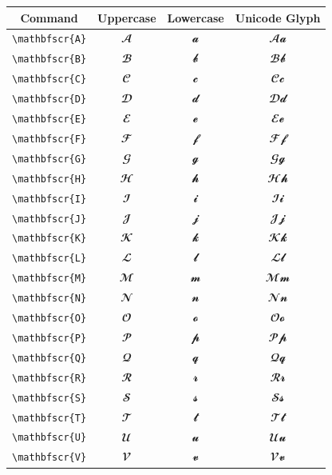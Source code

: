 \documentclass[12pt,a4paper]{article}
\begin{document}
\begin{longtable}{|c|c|c|c|}
\hline
\textbf{Command} & \textbf{Uppercase} & \textbf{Lowercase} & \textbf{Unicode Glyph} \\
\hline
\verb|\mathbfscr{A}| & $\mathbfscr{A}$ & $\mathbfscr{a}$ & $ 𝓐 𝓪 $ \\
\verb|\mathbfscr{B}| & $\mathbfscr{B}$ & $\mathbfscr{b}$ & $ 𝓑 𝓫 $ \\
\verb|\mathbfscr{C}| & $\mathbfscr{C}$ & $\mathbfscr{c}$ & $ 𝓒 𝓬 $ \\
\verb|\mathbfscr{D}| & $\mathbfscr{D}$ & $\mathbfscr{d}$ & $ 𝓓 𝓭 $ \\
\verb|\mathbfscr{E}| & $\mathbfscr{E}$ & $\mathbfscr{e}$ & $ 𝓔 𝓮 $ \\
\verb|\mathbfscr{F}| & $\mathbfscr{F}$ & $\mathbfscr{f}$ & $ 𝓕 𝓯 $ \\
\verb|\mathbfscr{G}| & $\mathbfscr{G}$ & $\mathbfscr{g}$ & $ 𝓖 𝓰 $ \\
\verb|\mathbfscr{H}| & $\mathbfscr{H}$ & $\mathbfscr{h}$ & $ 𝓗 𝓱 $ \\
\verb|\mathbfscr{I}| & $\mathbfscr{I}$ & $\mathbfscr{i}$ & $ 𝓘 𝓲 $ \\
\verb|\mathbfscr{J}| & $\mathbfscr{J}$ & $\mathbfscr{j}$ & $ 𝓙 𝓳 $ \\
\verb|\mathbfscr{K}| & $\mathbfscr{K}$ & $\mathbfscr{k}$ & $ 𝓚 𝓴 $ \\
\verb|\mathbfscr{L}| & $\mathbfscr{L}$ & $\mathbfscr{l}$ & $ 𝓛 𝓵 $ \\
\verb|\mathbfscr{M}| & $\mathbfscr{M}$ & $\mathbfscr{m}$ & $ 𝓜 𝓶 $ \\
\verb|\mathbfscr{N}| & $\mathbfscr{N}$ & $\mathbfscr{n}$ & $ 𝓝 𝓷 $ \\
\verb|\mathbfscr{O}| & $\mathbfscr{O}$ & $\mathbfscr{o}$ & $ 𝓞 𝓸 $ \\
\verb|\mathbfscr{P}| & $\mathbfscr{P}$ & $\mathbfscr{p}$ & $ 𝓟 𝓹 $ \\
\verb|\mathbfscr{Q}| & $\mathbfscr{Q}$ & $\mathbfscr{q}$ & $ 𝓠 𝓺 $ \\
\verb|\mathbfscr{R}| & $\mathbfscr{R}$ & $\mathbfscr{r}$ & $ 𝓡 𝓻 $ \\
\verb|\mathbfscr{S}| & $\mathbfscr{S}$ & $\mathbfscr{s}$ & $ 𝓢 𝓼 $ \\
\verb|\mathbfscr{T}| & $\mathbfscr{T}$ & $\mathbfscr{t}$ & $ 𝓣 𝓽 $ \\
\verb|\mathbfscr{U}| & $\mathbfscr{U}$ & $\mathbfscr{u}$ & $ 𝓤 𝓾 $ \\
\verb|\mathbfscr{V}| & $\mathbfscr{V}$ & $\mathbfscr{v}$ & $ 𝓥 𝓿 $ \\

\end{longtable}
\end{document}
